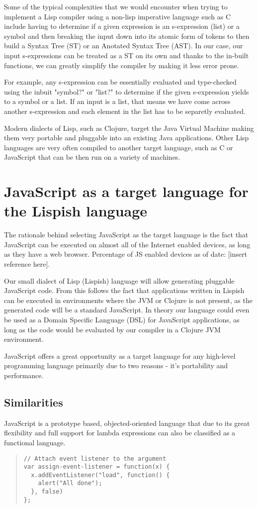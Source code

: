 Some of the typical complexities that we would encounter when trying to implement a Lisp compiler using a non-lisp imperative language such as C include having to determine if a given expression is an s-expression (list) or a symbol and then breaking the input down into its atomic form of tokens to then build a Syntax Tree (ST) or an Anotated Syntax Tree (AST).
In our case, our input s-expressions can be treated as a ST on its own and thanks to the in-built functions, we can greatly simplify the compiler by making it less error prone.

For example, any s-expression can be essentially evaluated and type-checked using the inbuit "symbol?" or "list?" to determine if the given s-expression yields to a symbol or a list. If an input is a list, that means we have come across another s-expression and each element in the list has to be separetly evaluated. 

Modern dialects of Lisp, such as Clojure, target the Java Virtual Machine making them very portable and pluggable into an existing Java applications.
Other Lisp languages are very often compiled to another target language, such as C or JavaScript that can be then run on a variety of machines. 

\section{JavaScript as a target language for the Lispish language}
The rationale behind selecting JavaScript as the target language is the fact that JavaScript can be executed on almost all of the Internet enabled devices, as long as they have a web browser. Percentage of JS enabled devices as of date: [insert reference here].

Our small dialect of Lisp (Lispish) language will allow generating pluggable JavaScript code. 
From this follows the fact that applications written in Lispish can be executed in environments where the JVM or Clojure is not present, as the generated code will be a standard JavaScript.
In theory our language could even be used as a Domain Specific Language (DSL) for JavaScript applications, as long as the code would be evaluated by our compiler in a Clojure JVM environment.

JavaScript offers a great opportunity as a target language for any high-level programming language primarily due to two reasons - it's portability and performance. 

\subsection{Similarities}
JavaScript is a prototype based, objected-oriented language that due to its great flexibility and full support for lambda expressions can also be classified as a functional language.
\begin{quote}
\begin{verbatim}
// Attach event listener to the argument
var assign-event-listener = function(x) {
  x.addEventListener("load", function() { 
    alert("All done"); 
  }, false)
};
\end{verbatim}
\end{quote}

